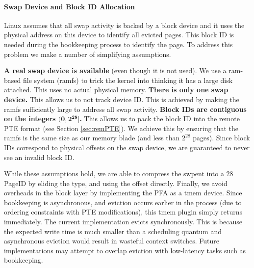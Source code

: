 \paragraph{Swap Device and Block ID Allocation}
Linux assumes that all swap activity is backed by a block device and it uses
the physical address on this device to identify all evicted pages. This block
ID is needed during the bookkeeping process to identify the page. To address
this problem we make a number of simplifying assumptions.

\begin{outline}[enumerate]
	\1 \textbf{A real swap device is available} (even though it is not used). We
		use a ram-based file system (ramfs) to trick the kernel into thinking it has
		a large disk attached. This uses no actual physical memory.
	\1 \textbf{There is only one swap device.} This allows us to not track device
		ID. This is achieved by making the ramfs sufficiently large to address all
		swap activity.
	\1 \textbf{Block IDs are contiguous on the integers $\mathbf{(0, 2^{28}]}$.}
		This allows us to pack the block ID into the remote PTE format (see Section
		\ref{sec:remPTE}). We achieve this by ensuring that the ramfs is the same
		size as our memory blade (and less than $2^{28}$ pages). Since block IDs
		correspond to physical offsets on the swap device, we are guaranteed to
		never see an invalid block ID.
\end{outline}

While these assumptions hold, we are able to compress the \gls{swpent} into a
\SI{28}{\bit} PageID by eliding the type, and using the offset directly.
Finally, we avoid overheads in the block layer by implementing the PFA as a
\gls{tmem} device. Since bookkeeping is asynchronous, and eviction occurs
earlier in the process (due to ordering constraints with PTE modifications),
this \gls{tmem} plugin simply returns immediately. The current implementation
evicts synchronously. This is because the expected write time is much smaller
than a scheduling quantum and asynchronous eviction would result in wasteful
context switches. Future implementations may attempt to overlap eviction with
low-latency tasks such as bookkeeping.

